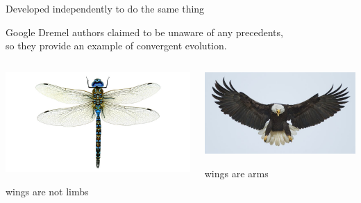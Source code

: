 \documentclass[aspectratio=169]{beamer}
\begin{document}
\begin{frame}{Developed independently to do the same thing}
\begin{center}
\Large Google Dremel authors claimed to be unaware of any precedents, \\ so they provide an example of convergent evolution.
\end{center}

\begin{columns}
\begin{center}
\includegraphics[width=\linewidth]{dragonfly.jpg}

\vspace{0.25 cm}
wings are not limbs
\end{center}

\begin{center}
\includegraphics[width=\linewidth]{bird.jpg}

\vspace{0.25 cm}
wings are arms
\end{center}


\end{columns}
\end{frame}
\end{document}
